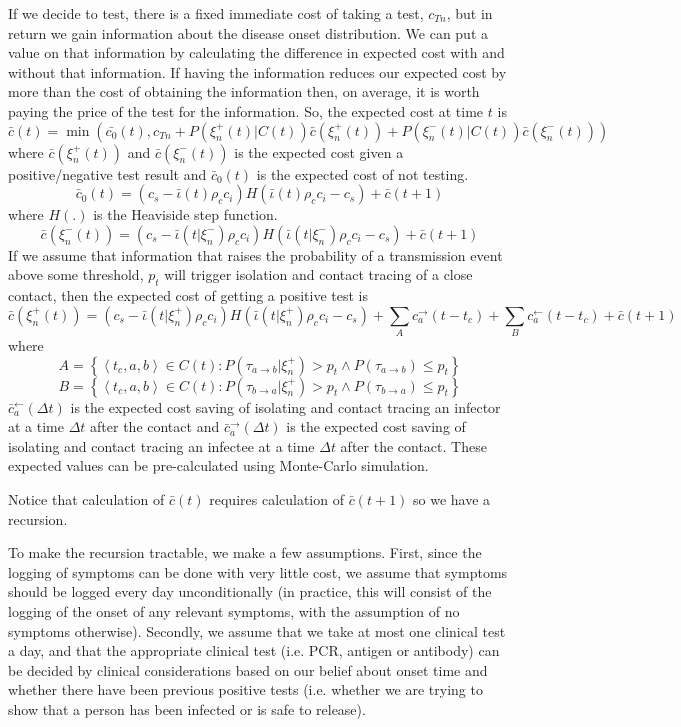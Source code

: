 \documentclass{article}
\begin{document}
If we decide to test, there is a fixed immediate cost of taking a test, $c_{Tn}$, but in return we gain information about the disease onset distribution. We can put a value on that information by calculating the difference in expected cost with and without that information. If having the information reduces our expected cost by more than the cost of obtaining the information then, on average, it is worth paying the price of the test for the information. So, the expected cost at time $t$ is
\[
\bar{c}(t) = \min(\bar{c_0}(t), c_{Tn} + P(\xi_n^+(t)|C(t))\bar{c}(\xi_n^+(t)) + P(\xi_n^-(t)|C(t))\bar{c}(\xi_n^-(t)))
\]
where $\bar{c}(\xi_n^+(t))$ and $\bar{c}(\xi_n^-(t))$ is the expected cost given a positive/negative test result and $\bar{c}_0(t)$ is the expected cost of not testing.
\[
\bar{c}_0(t) = (c_s - \bar{\iota}(t)\rho_cc_i)H(\bar{\iota}(t)\rho_cc_i - c_s) + \bar{c}(t+1)
\]
where $H(.)$ is the Heaviside step function.
\[
\bar{c}(\xi_n^-(t)) = (c_s - \bar{\iota}(t|\xi_n^-)\rho_cc_i)H(\bar{\iota}(t|\xi_n^-)\rho_cc_i - c_s) + \bar{c}(t+1)
\]
If we assume that information that raises the probability of a transmission event above some threshold, $p_t$ will trigger isolation and contact tracing of a close contact, then the expected cost of getting a positive test is
\[
\bar{c}(\xi_n^+(t)) = 
  (c_s - \bar{\iota}(t|\xi_n^+)\rho_cc_i)H(\bar{\iota}(t|\xi_n^+)\rho_cc_i - c_s) + 
  \sum_{A} c_a^\rightarrow(t-t_c) 
+   \sum_{B} c_a^\leftarrow(t-t_c) 
+ \bar{c}(t+1)
\]
where 
\[
A = \left\{
    \left<t_c,a,b\right> \in C(t): P(\tau_{a\rightarrow b}|\xi_n^+) > p_{t} \wedge P(\tau_{a\rightarrow b}) \le p_{t}
  \right\}
\]
\[
B = \left\{
    \left<t_c,a,b\right> \in C(t): P(\tau_{b\rightarrow a}|\xi_n^+) > p_{t} \wedge P(\tau_{b\rightarrow a}) \le p_{t}
  \right\}
\]
$\bar{c}_a^\leftarrow(\Delta t)$ is the expected cost saving of isolating and contact tracing an infector at a time $\Delta t$ after the contact and $\bar{c}_a^\rightarrow(\Delta t)$ is the expected cost saving of isolating and contact tracing an infectee at a time $\Delta t$ after the contact. These expected values can be pre-calculated using Monte-Carlo simulation. 


Notice that calculation of $\bar{c}(t)$ requires calculation of $\bar{c}(t+1)$ so we have a recursion.

To make the recursion tractable, we make a few assumptions. First, since the logging of symptoms can be done with very little cost, we assume that symptoms should be logged every day unconditionally (in practice, this will consist of the logging of the onset of any relevant symptoms, with the assumption of no symptoms otherwise). Secondly, we assume that we take at most one clinical test a day, and that the appropriate clinical test (i.e. PCR, antigen or antibody) can be decided by clinical considerations based on our belief about onset time and whether there have been previous positive tests (i.e. whether we are trying to show that a person has been infected or is safe to release).
\end{document}

